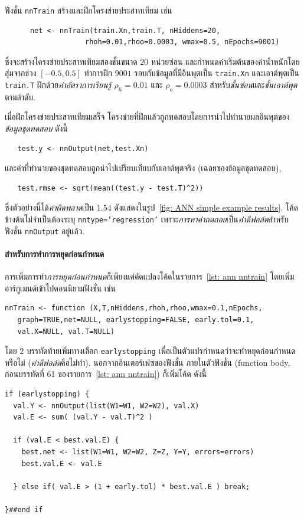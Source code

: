 ฟังชั่น \texttt{nnTrain} สร้างและฝึกโครงข่ายประสาทเทียม เช่น
\begin{verbatim}
      net <- nnTrain(train.Xn,train.T, nHiddens=20, 
                   rhoh=0.01,rhoo=0.0003, wmax=0.5, nEpochs=9001)
\end{verbatim}
ซึ่งจะสร้างโครงข่ายประสาทเทียมสองชั้นขนาด $20$ หน่วยซ่อน 
และกำหนดค่าเริ่มต้นของค่าน้ำหนักโดยสุ่มจากช่วง $[-0.5, 0.5]$ 
ทำการฝึก $9001$ รอบกับข้อมูลที่มีอินพุตเป็น \texttt{train.Xn} และเอาต์พุตเป็น \texttt{train.T} 
ฝึกด้วย\textit{ค่าอัตราการเรียนรู้} $\rho_h = 0.01$ และ $\rho_o = 0.0003$ 
สำหรับ\textit{ชั้นซ่อน}และ\textit{ชั้นเอาต์พุต}ตามลำดับ.

เมื่อฝึกโครงข่ายประสาทเทียมเสร็จ โครงข่ายที่ฝึกแล้วถูกทดสอบโดยการนำไปทำนายผลอินพุตของ\textit{ข้อมูลชุดทดสอบ} ดังนี้
\begin{verbatim}
   test.y <- nnOutput(net,test.Xn)
\end{verbatim}
และค่าที่ทำนายของชุดทดสอบถูกนำไปเปรียบเทียบกับเอาต์พุตจริง (เฉลยของข้อมูลชุดทดสอบ),
\begin{verbatim}
   test.rmse <- sqrt(mean((test.y - test.T)^2))
\end{verbatim}
ซึ่งตัวอย่างนี้ได้\textit{ค่าผิดพลาด}เป็น $1.54$ ดังแสดงในรูป~\ref{fig: ANN simple example results}.
โค้ดข้างต้นไม่จำเป็นต้องระบุ \texttt{nntype='regression'} 
เพราะ\textit{การหาค่าถดถอย}เป็น\textit{ค่าดีฟอล์ต}สำหรับฟังชั่น \texttt{nnOutput} อยู่แล้ว.

\paragraph{สำหรับการทำการหยุดก่อนกำหนด}
การเพิ่มการทำ\textit{การหยุดก่อนกำหนด}ก็เพียงแค่ดัดแปลงโค้ดในรายการ~\ref{lst: ann nntrain} 
โดยเพิ่มอาร์กูเมนต์เข้าไปตอนนิยามฟังชั่น เช่น
\begin{verbatim}
nnTrain <- function (X,T,nHiddens,rhoh,rhoo,wmax=0.1,nEpochs,
   graph=TRUE,net=NULL, earlystopping=FALSE, early.tol=0.1,  
   val.X=NULL, val.T=NULL)
\end{verbatim}
โดย $2$ บรรทัดท้ายเพิ่มทางเลือก \texttt{earlystopping} เพื่อเป็นตัวแปรกำหนดว่าจะทำหยุดก่อนกำหนดหรือไม่ (\textit{ค่าดีฟอล์ต}คือไม่ทำ).
นอกจากอินเตอร์เฟซของฟังชั่น ภายในตัวฟังชั่น (function body, ก่อนบรรทัดที่ 61 ของรายการ~\ref{lst: ann nntrain}) ก็เพิ่มโค้ด ดังนี้
\begin{verbatim}
if (earlystopping) {
  val.Y <- nnOutput(list(W1=W1, W2=W2), val.X)
  val.E <- sum( (val.Y - val.T)^2 )

  if (val.E < best.val.E) {
    best.net <- list(W1=W1, W2=W2, Z=Z, Y=Y, errors=errors)
    best.val.E <- val.E

  } else if( val.E > (1 + early.tol) * best.val.E ) break;

}##end if
\end{verbatim}

